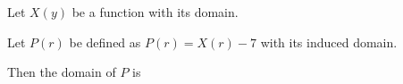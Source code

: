 \documentclass{ximera}
\begin{document}
Let $X(y)$ be a function with its domain.

Let $P(r)$ be defined as $P(r) = X(r)-7$ with its induced domain.


Then the domain of $P$ is

\begin{multipleChoice}
\end{multipleChoice}
\end{document}
